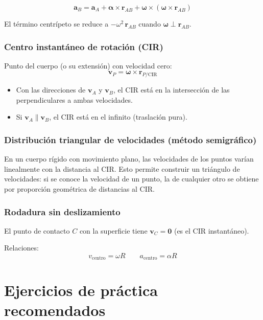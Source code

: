 \documentclass[12pt,a4paper]{article}
\begin{document}
\[
\mathbf{a}_B = \mathbf{a}_A + \boldsymbol{\alpha} \times \mathbf{r}_{AB}
              + \boldsymbol{\omega} \times (\boldsymbol{\omega} \times \mathbf{r}_{AB})
\]

El término centrípeto se reduce a $-\omega^2\,\mathbf{r}_{AB}$ cuando
$\boldsymbol{\omega} \perp \mathbf{r}_{AB}$.

\subsubsection*{Centro instantáneo de rotación (CIR)}

Punto del cuerpo (o su extensión) con velocidad cero:
\[
\mathbf{v}_P = \boldsymbol{\omega} \times \mathbf{r}_{P/\text{CIR}}
\]

\begin{tipbox}
\begin{itemize}
    \item Con las direcciones de $\mathbf{v}_A$ y $\mathbf{v}_B$, el CIR está en la
          intersección de las perpendiculares a ambas velocidades.
    \item Si $\mathbf{v}_A \parallel \mathbf{v}_B$, el CIR está en el infinito
          (traslación pura).
\end{itemize}
\end{tipbox}

\subsubsection*{Distribución triangular de velocidades (método semigráfico)}

En un cuerpo rígido con movimiento plano, las velocidades de los puntos varían
linealmente con la distancia al CIR. Esto permite construir un triángulo de
velocidades: si se conoce la velocidad de un punto, la de cualquier otro se
obtiene por proporción geométrica de distancias al CIR.

\subsubsection*{Rodadura sin deslizamiento}

El punto de contacto $C$ con la superficie tiene $\mathbf{v}_C = \mathbf{0}$
(es el CIR instantáneo).

Relaciones:
\[
v_{\text{centro}} = \omega R
\qquad
a_{\text{centro}} = \alpha R
\]

\newpage

\section{Ejercicios de práctica recomendados}
\end{document}
